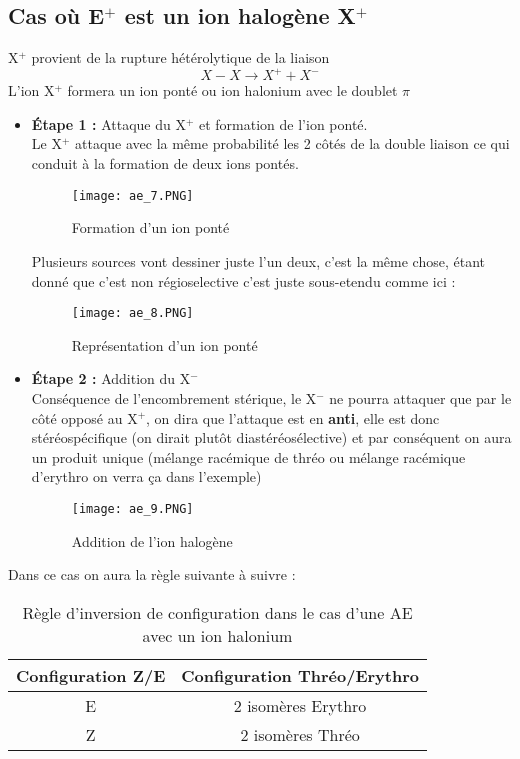 \documentclass[a4paper, oneside]{book}
\begin{document}
\subsection{Cas où E$^+$ est un ion halogène X$^+$}
X$^+$ provient de la rupture hétérolytique de la liaison
\[
    X - X \longrightarrow X^+ + X^-
\]
L'ion X$^+$ formera un ion ponté ou ion halonium avec le doublet $\pi$
\begin{itemize}
    \item \textbf{\'Etape 1 :} Attaque du X$^+$ et formation de l'ion ponté.\\
    Le X$^+$ attaque avec la même probabilité les 2 côtés de la double liaison ce qui conduit à la formation de deux ions pontés.
    \begin{figure}[!h]
        \centering
        \texttt{[image: ae\_7.PNG]}
        \caption{Formation d'un ion ponté}
        \label{fig:my_label}
    \end{figure}
    
    Plusieurs sources vont dessiner juste l'un deux, c'est la même chose, étant donné que c'est non régioselective c'est juste sous-etendu comme ici :
    \begin{figure}[!h]
        \centering
        \texttt{[image: ae\_8.PNG]}
        \caption{Représentation d'un ion ponté}
        \label{fig:my_label}
    \end{figure}
    \newpage
    \item \textbf{\'Etape 2 :} Addition du X$^-$\\
    Conséquence de l'encombrement stérique, le X$^-$ ne pourra attaquer que par le côté opposé au X$^+$, on dira que l'attaque est en \textbf{anti}, elle est donc stéréospécifique (on dirait plutôt diastéréosélective) et par conséquent on aura un produit unique (mélange racémique de thréo ou mélange racémique d'erythro on verra ça dans l'exemple)
    \begin{figure}[!h]
        \centering
        \texttt{[image: ae\_9.PNG]}
        \caption{Addition de l'ion halogène}
        \label{fig:my_label}
    \end{figure}
\end{itemize}
Dans ce cas on aura la règle suivante à suivre :
\begin{table}[!h]
    \centering
    \begin{tabular}{|c|c|}
        \hline
        \textbf{Configuration Z/E} & \textbf{Configuration Thréo/Erythro}\\
        \hline
        E & 2 isomères Erythro\\
        \hline
        Z & 2 isomères Thréo\\
        \hline
    \end{tabular}
    \caption{Règle d'inversion de configuration dans le cas d'une AE avec un ion halonium}
    \label{tab:my_label}
\end{table}
\end{document}
